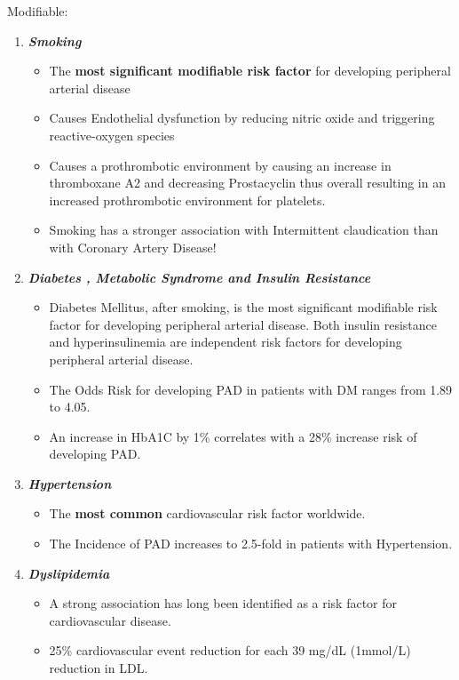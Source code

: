 \documentclass[
]{book}
\begin{document}
Modifiable:

\begin{enumerate}
\def\labelenumi{\arabic{enumi}.}
\item
  \textbf{\emph{Smoking}}

  \begin{itemize}
  \item
    The \textbf{most significant modifiable risk factor} for developing
    peripheral arterial disease
  \item
    Causes Endothelial dysfunction by reducing nitric oxide and
    triggering reactive-oxygen species
    \citep{unitedstatessurgeongeneralHealthConsequencesSmoking2014}
  \item
    Causes a prothrombotic environment by causing an increase in
    thromboxane A2 and decreasing Prostacyclin thus overall
    resulting in an increased prothrombotic environment for
    platelets.
  \item
    Smoking has a stronger association with Intermittent
    claudication than with Coronary Artery Disease!
    \citep{gordonPredispositionAtherosclerosisHead1972}
  \end{itemize}
\item
  \textbf{\emph{Diabetes , Metabolic Syndrome and Insulin Resistance}}

  \begin{itemize}
  \item
    Diabetes Mellitus, after smoking, is the most significant
    modifiable risk factor for developing peripheral arterial
    disease. Both insulin resistance and hyperinsulinemia are
    independent risk factors for developing peripheral arterial
    disease.
  \item
    The Odds Risk for developing PAD in patients with DM ranges from
    1.89 to 4.05.
  \item
    An increase in HbA1C by 1\% correlates with a 28\% increase risk
    of developing PAD. \citep{adlerUKPDS59Hyperglycemia2002}
  \end{itemize}
\item
  \textbf{\emph{Hypertension}}

  \begin{itemize}
  \item
    The \textbf{most common} cardiovascular risk factor worldwide.
  \item
    The Incidence of PAD increases to 2.5-fold in patients with
    Hypertension. \citep{kannelUpdateEpidemiologicFeatures1985}
  \end{itemize}
\item
  \textbf{\emph{Dyslipidemia}}

  \begin{itemize}
  \item
    A strong association has long been identified as a risk factor
    for cardiovascular disease.
  \item
    25\% cardiovascular event reduction for each 39 mg/dL (1mmol/L)
    reduction in LDL.
    \citep{heartprotectionstudycollaborativegroupRandomizedTrialEffects2007}
  \end{itemize}
\end{enumerate}
\end{document}
